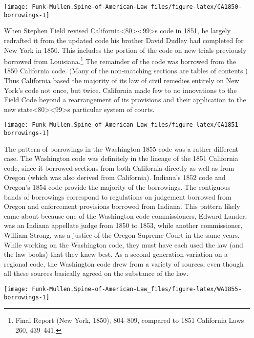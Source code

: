 \documentclass[12pt,]{article}
\let\rmarkdownfootnote\footnote%
\def\footnote{\protect\rmarkdownfootnote}
\begin{document}
\begin{center}\texttt{[image: Funk-Mullen.Spine-of-American-Law\_files/figure-latex/CA1850-borrowings-1]} \end{center}

When Stephen Field revised
California\textless80\textgreater\textless99\textgreater s code in 1851,
he largely redrafted it from the updated code his brother David Dudley
had completed for New York in 1850. This includes the portion of the
code on new trials previously borrowed from Louisiana.\footnote{Final
  Report (New York, 1850), 804--809, compared to 1851 California Laws
  260, 439--441.} The remainder of the code was borrowed from the 1850
California code. (Many of the non-matching sections are tables of
contents.) Thus California based the majority of its law of civil
remedies entirely on New York's code not once, but twice. California
made few to no innovations to the Field Code beyond a rearrangement of
its provisions and their application to the new
state\textless80\textgreater\textless99\textgreater s particular system
of courts.

\begin{center}\texttt{[image: Funk-Mullen.Spine-of-American-Law\_files/figure-latex/CA1851-borrowings-1]} \end{center}

The pattern of borrowings in the Washington 1855 code was a rather
different case. The Washington code was definitely in the lineage of the
1851 California code, since it borrowed sections from both California
directly as well as from Oregon (which was also derived from
California). Indiana's 1852 code and Oregon's 1854 code provide the
majority of the borrowings. The contiguous bands of borrowings
correspond to regulations on judgement borrowed from Oregon and
enforcement provisions borrowed from Indiana. This pattern likely came
about because one of the Washington code commissioners, Edward Lander,
was an Indiana appellate judge from 1850 to 1853, while another
commissioner, William Strong, was a justice of the Oregon Supreme Court
in the same years. While working on the Washington code, they must have
each used the law (and the law books) that they knew best. As a second
generation variation on a regional code, the Washington code drew from a
variety of sources, even though all these sources basically agreed on
the substance of the law.

\begin{center}\texttt{[image: Funk-Mullen.Spine-of-American-Law\_files/figure-latex/WA1855-borrowings-1]} \end{center}
\end{document}
